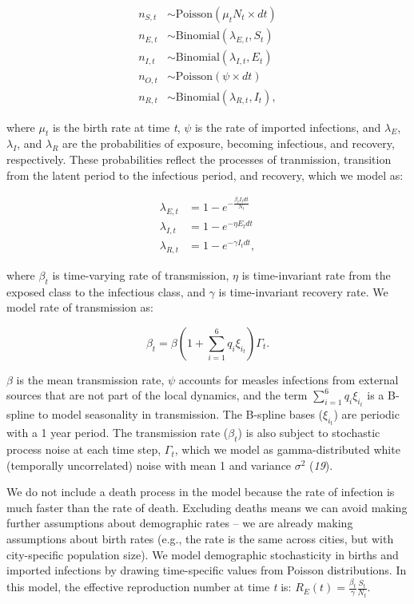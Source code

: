 \documentclass[3p]{elsarticle} %
\begin{document}
\begin{align}
n_{S,t} &\sim \text{Poisson}(\mu_t N_t \times dt) \\
n_{E,t} &\sim \text{Binomial}(\lambda_{E,t}, S_{t}) \\
n_{I,t} &\sim \text{Binomial}(\lambda_{I,t}, E_{t}) \\
n_{O,t} &\sim \text{Poisson}(\psi \times dt) \\
n_{R,t} &\sim \text{Binomial}(\lambda_{R,t}, I_{t}),
\end{align}

\noindent{}where \(\mu_t\) is the birth rate at time \emph{t}, \(\psi\)
is the rate of imported infections, and \(\lambda_E\), \(\lambda_I\),
and \(\lambda_R\) are the probabilities of exposure, becoming
infectious, and recovery, respectively. These probabilities reflect the
processes of tranmission, transition from the latent period to the
infectious period, and recovery, which we model as:

\begin{align}
\lambda_{E,t} &= 1 - e^{-\frac{\beta_t I_t dt}{N_t}} \\
\lambda_{I,t} &= 1 - e^{-\eta E_{t} dt} \\
\lambda_{R,t} &= 1 - e^{-\gamma I_{t} dt},
\end{align}

\noindent{}where \(\beta_t\) is time-varying rate of transmission,
\(\eta\) is time-invariant rate from the exposed class to the infectious
class, and \(\gamma\) is time-invariant recovery rate. We model rate of
transmission as:

\begin{equation}
\beta_t = \beta \left(1 + \sum^6_{i=1} q_i \xi_{i_{t}} \right) \Gamma_t.
\end{equation}

\(\beta\) is the mean transmission rate, \(\psi\) accounts for measles
infections from external sources that are not part of the local
dynamics, and the term \(\sum^6_{i=1} q_i \xi_{i_{t}}\) is a B-spline to
model seasonality in transmission. The B-spline bases (\(\xi_{i_{t}}\))
are periodic with a 1 year period. The transmission rate (\(\beta_t\))
is also subject to stochastic process noise at each time step,
\(\Gamma_t\), which we model as gamma-distributed white (temporally
uncorrelated) noise with mean 1 and variance \(\sigma^2\) (\emph{19}).

We do not include a death process in the model because the rate of
infection is much faster than the rate of death. Excluding deaths means
we can avoid making further assumptions about demographic rates -- we
are already making assumptions about birth rates (e.g., the rate is the
same across cities, but with city-specific population size). We model
demographic stochasticity in births and imported infections by drawing
time-specific values from Poisson distributions. In this model, the
effective reproduction number at time \emph{t} is:
\(R_E(t) = \frac{\beta_t}{\gamma} \frac{S_t}{N_t}\).
\end{document}
